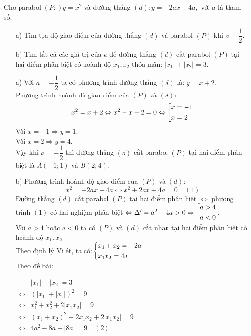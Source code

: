 \begin{ex}%
    Cho parabol $(P:)y=x^2$ và đường thẳng $(d):y=-2ax-4a,$ với $a$ là tham số. 
    \begin{enumerate}
        \item[a)] Tìm tọa độ giao điểm của đường thẳng $(d)$ và parabol $(P)$ khi $a=\dfrac{1}{2}$.
        \item[b)] Tìm tất cả các giá trị của $a$ để đường thẳng $(d)$ cắt parabol $(P)$ tại hai điểm phân biệt có hoành độ $x_1,x_2$ thỏa mãn: $|x_1|+|x_2|=3$.
    \end{enumerate}
\loigiai
    {
    \begin{enumerate}
        \item[a)] Với $a=-\dfrac{1}{2}$ ta có phương trình đường thẳng $(d)$ là: $y=x+2.$ \\
        Phương trình hoành độ giao điểm của $(P)$ và $(d):$
        $$x^2=x+2\Leftrightarrow x^2-x-2=0\Leftrightarrow\left[\begin{aligned}x&=-1\\x&=2\end{aligned}\right.$$
        Với $x=-1\Rightarrow y =1.$\\
      Với $x=2\Rightarrow y=4.$\\
      Vậy khi $a=-\dfrac{1}{2}$ thì đường thẳng $(d)$ cắt parabol $(P)$ tại hai điểm phân biệt là $A(-1;1)$ và $B(2;4).$
    	\item[b)]    Phương trình hoành độ giao điểm của $(P)$ và $(d):$
    	$$x^2=-2ax-4a\Leftrightarrow x^2+2ax+4a=0\quad (1)$$
    	Đường thẳng $(d)$ cắt parabol $(P)$ tại hai điểm phân biệt $\Leftrightarrow$ phương trình $(1)$ có hai nghiệm phân biệt $\Leftrightarrow\Delta'=a^2-4a>0\Leftrightarrow\left[\begin{aligned}a>4\\a<0\end{aligned}\right..$
    \\Với $a>4$ hoặc $a<0$ ta có $(P)$ và $(d)$ cắt nhau tại hai điểm phân biệt có hoành độ $x_1,x_2.$\\
    Theo định lý Vi ét, ta có:$\left\{\begin{aligned}&x_1+x_2=-2a\\&x_1x_2=4a\end{aligned}\right.$	\\
    Theo đề bài:\begin{center} $\begin{array}{ll}&|x_1|+|x_2|=3\\\Leftrightarrow&(|x_1|+|x_2|)^2=9\\\Leftrightarrow& x_1^2+x_2^2+2|x_1x_2|=9\\\Leftrightarrow&(x_1+x_2)^2-2x_1x_2+2|x_1x_2|=9\\\Leftrightarrow&4a^2-8a+|8a|=9\quad (2)\end{array}$

\end{center}
\end{enumerate}}
\end{ex}
